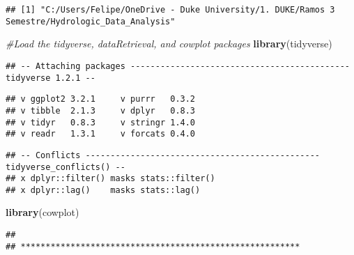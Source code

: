 \documentclass[]{article}
\newenvironment{Shaded}{\begin{snugshade}}{\end{snugshade}}
\newcommand{\CommentTok}[1]{\textcolor[rgb]{0.56,0.35,0.01}{\textit{#1}}}
\newcommand{\DataTypeTok}[1]{\textcolor[rgb]{0.13,0.29,0.53}{#1}}
\newcommand{\KeywordTok}[1]{\textcolor[rgb]{0.13,0.29,0.53}{\textbf{#1}}}
\newcommand{\NormalTok}[1]{#1}
\newcommand{\OperatorTok}[1]{\textcolor[rgb]{0.81,0.36,0.00}{\textbf{#1}}}
\newcommand{\OtherTok}[1]{\textcolor[rgb]{0.56,0.35,0.01}{#1}}
\begin{document}
\begin{Shaded}
\end{Shaded}

\begin{verbatim}
## [1] "C:/Users/Felipe/OneDrive - Duke University/1. DUKE/Ramos 3 Semestre/Hydrologic_Data_Analysis"
\end{verbatim}

\begin{Shaded}
\begin{Highlighting}[]
\CommentTok{#Load the tidyverse, dataRetrieval, and cowplot packages}
\KeywordTok{library}\NormalTok{(tidyverse)}
\end{Highlighting}
\end{Shaded}

\begin{verbatim}
## -- Attaching packages -------------------------------------------- tidyverse 1.2.1 --
\end{verbatim}

\begin{verbatim}
## v ggplot2 3.2.1     v purrr   0.3.2
## v tibble  2.1.3     v dplyr   0.8.3
## v tidyr   0.8.3     v stringr 1.4.0
## v readr   1.3.1     v forcats 0.4.0
\end{verbatim}

\begin{verbatim}
## -- Conflicts ----------------------------------------------- tidyverse_conflicts() --
## x dplyr::filter() masks stats::filter()
## x dplyr::lag()    masks stats::lag()
\end{verbatim}

\begin{Shaded}
\begin{Highlighting}[]
\KeywordTok{library}\NormalTok{(cowplot)}
\end{Highlighting}
\end{Shaded}

\begin{verbatim}
## 
## ********************************************************
\end{verbatim}
\end{document}
